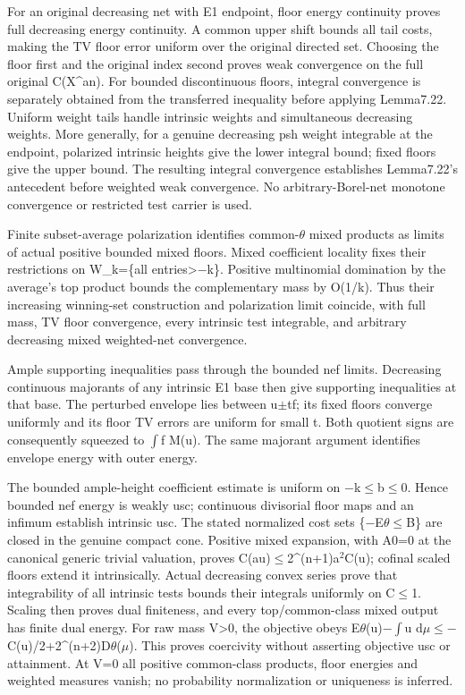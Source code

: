 \documentclass[
]{article}
\begin{document}
For an original decreasing net with E1 endpoint, floor energy continuity
proves full decreasing energy continuity. A common upper shift bounds
all tail costs, making the TV floor error uniform over the original
directed set. Choosing the floor first and the original index second
proves weak convergence on the full original C(X\^{}an). For bounded
discontinuous floors, integral convergence is separately obtained from
the transferred inequality before applying Lemma7.22. Uniform weight
tails handle intrinsic weights and simultaneous decreasing weights. More
generally, for a genuine decreasing psh weight integrable at the
endpoint, polarized intrinsic heights give the lower integral bound;
fixed floors give the upper bound. The resulting integral convergence
establishes Lemma7.22's antecedent before weighted weak convergence. No
arbitrary-Borel-net monotone convergence or restricted test carrier is
used.

Finite subset-average polarization identifies common-\ensuremath{\theta} mixed products as
limits of actual positive bounded mixed floors. Mixed coefficient
locality fixes their restrictions on W\_k=\{all entries\textgreater\ensuremath{-}k\}.
Positive multinomial domination by the average's top product bounds the
complementary mass by O(1/k). Thus their increasing winning-set
construction and polarization limit coincide, with full mass, TV floor
convergence, every intrinsic test integrable, and arbitrary decreasing
mixed weighted-net convergence.

Ample supporting inequalities pass through the bounded nef limits.
Decreasing continuous majorants of any intrinsic E1 base then give
supporting inequalities at that base. The perturbed envelope lies
between u\ensuremath{\pm}\textbar t\textbar\textbar\textbar f\textbar\textbar; its
fixed floors converge uniformly and its floor TV errors are uniform for
small t. Both quotient signs are consequently squeezed to \ensuremath{\int}f M(u). The
same majorant argument identifies envelope energy with outer energy.

The bounded ample-height coefficient estimate is uniform on \ensuremath{-}k\ensuremath{\leq}b\ensuremath{\leq}0.
Hence bounded nef energy is weakly usc; continuous divisorial floor maps
and an infimum establish intrinsic usc. The stated normalized cost sets
\{\ensuremath{-}E\ensuremath{\theta}\ensuremath{\leq}B\} are closed in the genuine compact cone. Positive mixed
expansion, with A0=0 at the canonical generic trivial valuation, proves
C(au)\ensuremath{\leq}2\^{}(n+1)a\ensuremath{^{2}}C(u); cofinal scaled floors extend it intrinsically.
Actual decreasing convex series prove that integrability of all
intrinsic tests bounds their integrals uniformly on C\ensuremath{\leq}1. Scaling then
proves dual finiteness, and every top/common-class mixed output has
finite dual energy. For raw mass V\textgreater0, the objective obeys
E\ensuremath{\theta}(u)\ensuremath{-}\ensuremath{\int}u d\ensuremath{\mu}\ensuremath{\leq}\ensuremath{-}C(u)/2+2\^{}(n+2)D\ensuremath{\theta}(\ensuremath{\mu}). This proves coercivity without
asserting objective usc or attainment. At V=0 all positive common-class
products, floor energies and weighted measures vanish; no probability
normalization or uniqueness is inferred.
\end{document}
